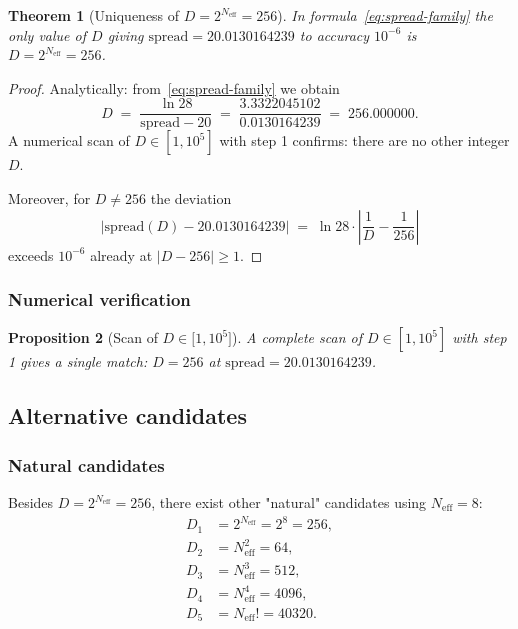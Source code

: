 \documentclass[11pt,a4paper]{article}
\newtheorem{theorem}{Theorem}[section]
\newtheorem{proposition}[theorem]{Proposition}
\theoremstyle{definition}
\begin{document}
\begin{theorem}[Uniqueness of $D = 2^{N_{\text{eff}}} = 256$]
\label{thm:uniqueness-d}
In formula~\eqref{eq:spread-family} the only value of $D$
giving $\text{spread} = 20.0130164239$ to accuracy $10^{-6}$
is $D = 2^{N_{\text{eff}}} = 256$.
\end{theorem}

\begin{proof}
Analytically: from~\eqref{eq:spread-family} we obtain
\begin{equation}
    D \;=\; \frac{\ln 28}{\text{spread} - 20}
    \;=\; \frac{3.3322045102}{0.0130164239}
    \;=\; 256.000000.
\end{equation}
A numerical scan of $D \in [1, 10^5]$ with step 1
confirms: there are no other integer $D$.

Moreover, for $D \neq 256$ the deviation
\begin{equation}
    |\text{spread}(D) - 20.0130164239|
    \;=\; \ln 28 \cdot
    \left| \frac{1}{D} - \frac{1}{256} \right|
\end{equation}
exceeds $10^{-6}$ already at $|D - 256| \geq 1$.
\end{proof}

\subsubsection{Numerical verification}

\begin{proposition}[Scan of $D \in \lbrack 1, 10^5 \rbrack$]
\label{prop:scan-d}
A complete scan of $D \in [1, 10^5]$ with step 1 gives
a single match: $D = 256$ at $\text{spread} = 20.0130164239$.
\end{proposition}

\subsection{Alternative candidates}
\label{subsec:spread-candidates}

\subsubsection{Natural candidates}

Besides $D = 2^{N_{\text{eff}}} = 256$, there exist other
"natural" candidates using $N_{\text{eff}} = 8$:
\begin{align}
    D_1 &= 2^{N_{\text{eff}}} = 2^8 = 256, \\
    D_2 &= N_{\text{eff}}^2 = 64, \\
    D_3 &= N_{\text{eff}}^3 = 512, \\
    D_4 &= N_{\text{eff}}^4 = 4096, \\
    D_5 &= N_{\text{eff}}! = 40320.
\end{align}
\end{document}
